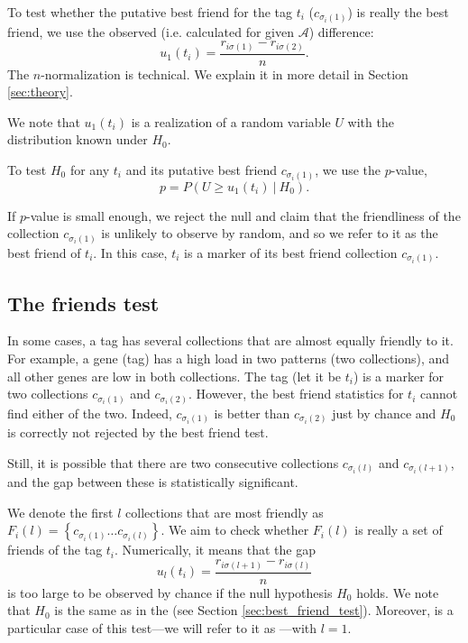 \documentclass{llncs}
\begin{document}
To test whether the putative best friend for the tag $t_i$ ($c_{\sigma_i(1)}$) is really the best friend, we use the observed (i.e. calculated for given $\mathcal{A}$) difference:
\begin{equation}
\label{def:u_1}
u_1(t_i) = \frac{r_{i\sigma(1)} -  r_{i\sigma(2)}}{n}.
\end{equation}
The $n$-normalization is technical. We explain it in more detail in Section \ref{sec:theory}.

We note that $u_1(t_i)$ is a realization of a random variable $U$ with the distribution known under $H_0$.


To test $H_0$ for any $t_i$ and its putative best friend $c_{\sigma_{i}(1)}$, we use the $p$-value,
\[
p = P\left(U \ge u_1(t_i)~|~H_0\right). 
\]

If $p$-value is small enough, we reject the null and claim that the friendliness of the collection $c_{\sigma_{i}(1)}$ is unlikely to observe by random, and so we refer to it as the best friend of $t_i$. In this case, $t_i$ is a marker of its best friend collection $c_{\sigma_{i}(1)}$.

\subsection{The friends test}
\label{sec:friends_test}

In some cases, a tag has several collections that are almost equally friendly to it. 
For example, a gene (tag) has a high load in two patterns (two collections), and all other genes are low in both collections. The tag (let it be $t_i$) is a marker for two collections $c_{\sigma_{i}(1)}$ and $c_{\sigma_{i}(2)}$. However, the best friend statistics for $t_i$ cannot find either of the two. 
Indeed, $c_{\sigma_{i}(1)}$ is better than $c_{\sigma_{i}(2)}$ just by chance and $H_0$ is correctly not rejected by the best friend test.

Still, it is possible that there are two consecutive collections $c_{\sigma_i(l)}$ and $c_{\sigma_i(l+1)}$, and the gap between these is statistically significant.

We denote the first $l$ collections that are most friendly as $F_{i}(l) = \left\{ c_{\sigma_i(1)} \dots c_{\sigma_i(l)} \right\}$.
We aim to check whether $F_{i}(l)$ is really a set of friends of the tag $t_i$. Numerically, it means that the gap 
\begin{equation}
\label{def:u_l}
u_{l}(t_i) = \frac{r_{i\sigma(l+1)} - r_{i\sigma(l)}}{n}
\end{equation}
is too large to be observed by chance if the null hypothesis $H_0$ holds. We note that $H_0$ is the same as in the  (see Section \ref{sec:best_friend_test}).
Moreover,  is a particular case of
this test---we will refer to it as ---with $l = 1$.
\end{document}
